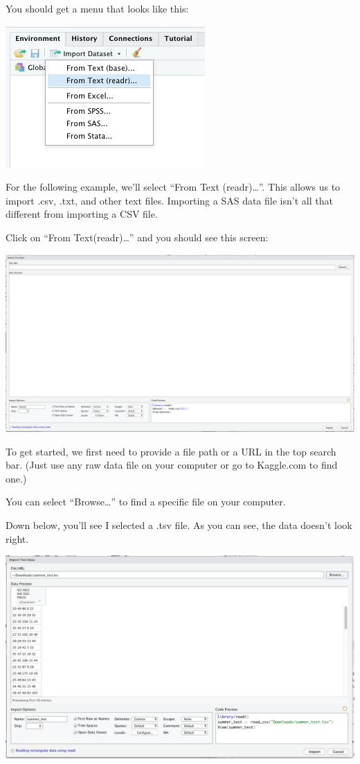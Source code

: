 \documentclass[
]{book}
\begin{document}
\begin{center}
You should get a menu that looks like this:

\begin{center}\includegraphics[width=0.5\linewidth]{1.58.1_Dropdown} \end{center}

For the following example, we'll select ``From Text (readr)\ldots{}''. This allows us to import .csv, .txt, and other text files. Importing a SAS data file isn't all that different from importing a CSV file.

Click on ``From Text(readr)\ldots{}'' and you should see this screen:

\begin{center}\includegraphics[width=0.75\linewidth]{1.59_Import_Raw_Data_Screen} \end{center}

To get started, we first need to provide a file path or a URL in the top search bar. (Just use any raw data file on your computer or go to Kaggle.com to find one.)

You can select ``Browse\ldots{}'' to find a specific file on your computer.

Down below, you'll see I selected a .tsv file. As you can see, the data doesn't look right.

\begin{center}\includegraphics[width=0.75\linewidth]{1.60_Funky_Data} \end{center}


\end{center}
\end{document}
